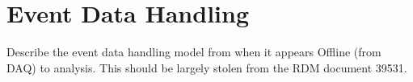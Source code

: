 \section{Event Data Handling}
Describe the event data handling model from when it appears Offline (from DAQ) to analysis.  This should be largely stolen from the RDM document 39531.
